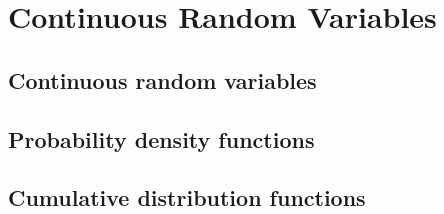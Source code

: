 \chapter{Continuous Random Variables}

\section{Continuous random variables}
\section{Probability density functions}
\section{Cumulative distribution functions}
